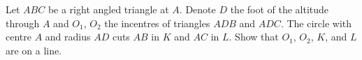\documentclass[varwidth]{standalone}
\begin{document}
    Let $ABC$ be a right angled triangle at $A$. Denote $D$ the foot of the altitude through $A$ and $O_1$, $O_2$ the incentres of triangles $ADB$ and $ADC$. The circle with centre $A$ and radius $AD$ cuts $AB$ in $K$ and $AC$ in $L$. Show that $O_1$, $O_2$, $K$, and $L$ are on a line.
\end{document}
